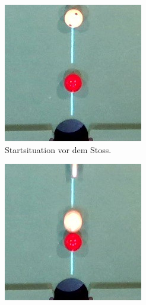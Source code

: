 \begin{figure}[h!]
    \centering
    \begin{subfigure}[t]{0.2\textwidth}
        \centering
        \includegraphics[width=1.0\linewidth]{../common/04_results/resources/simulation_vs_reality/simulation_vs_reality_1_0028_0032_situation_cut.jpg}
        \caption{Startsituation vor dem Stoss.}
        \label{fig:simulation_vs_reality_1_0028_0032_situation}
    \end{subfigure}
    \hfill
    \begin{subfigure}[t]{0.2\textwidth}
        \centering
        \includegraphics[width=1.0\linewidth]{../common/04_results/resources/simulation_vs_reality/simulation_vs_reality_1_0028_0032_collision_cut.jpg}

\end{subfigure}
\end{figure}
